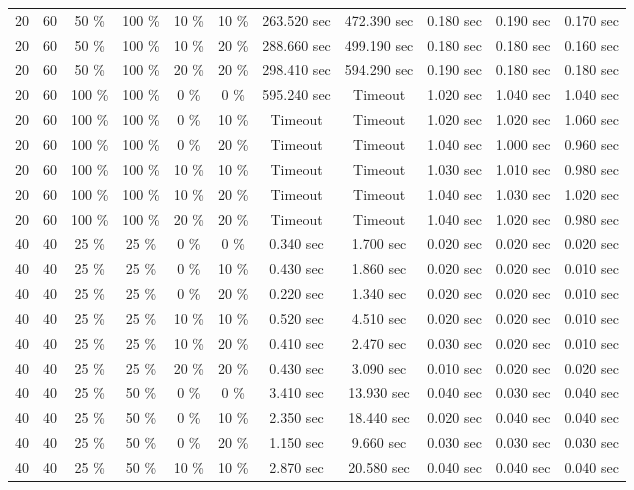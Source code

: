 \documentclass{article}
\begin{document}
\begin{longtable}[]{@{}ccccccccccc@{}}
20 & 60 & 50 \% & 100 \% & 10 \% & 10 \% & 263.520 sec & 472.390 sec & 0.180 sec & 0.190 sec & 0.170 sec \\
20 & 60 & 50 \% & 100 \% & 10 \% & 20 \% & 288.660 sec & 499.190 sec & 0.180 sec & 0.180 sec & 0.160 sec \\
20 & 60 & 50 \% & 100 \% & 20 \% & 20 \% & 298.410 sec & 594.290 sec & 0.190 sec & 0.180 sec & 0.180 sec \\
20 & 60 & 100 \% & 100 \% & 0 \% & 0 \% & 595.240 sec & Timeout & 1.020 sec & 1.040 sec & 1.040 sec \\
20 & 60 & 100 \% & 100 \% & 0 \% & 10 \% & Timeout & Timeout & 1.020 sec & 1.020 sec & 1.060 sec \\
20 & 60 & 100 \% & 100 \% & 0 \% & 20 \% & Timeout & Timeout & 1.040 sec & 1.000 sec & 0.960 sec \\
20 & 60 & 100 \% & 100 \% & 10 \% & 10 \% & Timeout & Timeout & 1.030 sec & 1.010 sec & 0.980 sec \\
20 & 60 & 100 \% & 100 \% & 10 \% & 20 \% & Timeout & Timeout & 1.040 sec & 1.030 sec & 1.020 sec \\
20 & 60 & 100 \% & 100 \% & 20 \% & 20 \% & Timeout & Timeout & 1.040 sec & 1.020 sec & 0.980 sec \\
40 & 40 & 25 \% & 25 \% & 0 \% & 0 \% & 0.340 sec & 1.700 sec & 0.020 sec & 0.020 sec & 0.020 sec \\
40 & 40 & 25 \% & 25 \% & 0 \% & 10 \% & 0.430 sec & 1.860 sec & 0.020 sec & 0.020 sec & 0.010 sec \\
40 & 40 & 25 \% & 25 \% & 0 \% & 20 \% & 0.220 sec & 1.340 sec & 0.020 sec & 0.020 sec & 0.010 sec \\
40 & 40 & 25 \% & 25 \% & 10 \% & 10 \% & 0.520 sec & 4.510 sec & 0.020 sec & 0.020 sec & 0.010 sec \\
40 & 40 & 25 \% & 25 \% & 10 \% & 20 \% & 0.410 sec & 2.470 sec & 0.030 sec & 0.020 sec & 0.010 sec \\
40 & 40 & 25 \% & 25 \% & 20 \% & 20 \% & 0.430 sec & 3.090 sec & 0.010 sec & 0.020 sec & 0.020 sec \\
40 & 40 & 25 \% & 50 \% & 0 \% & 0 \% & 3.410 sec & 13.930 sec & 0.040 sec & 0.030 sec & 0.040 sec \\
40 & 40 & 25 \% & 50 \% & 0 \% & 10 \% & 2.350 sec & 18.440 sec & 0.020 sec & 0.040 sec & 0.040 sec \\
40 & 40 & 25 \% & 50 \% & 0 \% & 20 \% & 1.150 sec & 9.660 sec & 0.030 sec & 0.030 sec & 0.030 sec \\
40 & 40 & 25 \% & 50 \% & 10 \% & 10 \% & 2.870 sec & 20.580 sec & 0.040 sec & 0.040 sec & 0.040 sec \\

\end{longtable}
\end{document}
